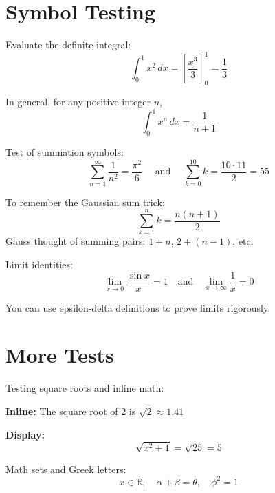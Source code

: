 \documentclass[11pt]{article}
\begin{document}
\section*{Symbol Testing}

\begin{examplebox}
Evaluate the definite integral:
\[
\int_0^1 x^2 \, dx = \left[ \frac{x^3}{3} \right]_0^1 = \frac{1}{3}
\]
\end{examplebox}

\begin{keynotebox}
In general, for any positive integer \( n \),
\[
\int_0^1 x^n \, dx = \frac{1}{n+1}
\]
\end{keynotebox}


\begin{examplebox}
Test of summation symbols:
\[
\sum_{n=1}^{\infty} \frac{1}{n^2} = \frac{\pi^2}{6}
\quad \text{ and } \quad
\sum_{k=0}^{10} k = \frac{10 \cdot 11}{2} = 55
\]
\end{examplebox}

\begin{funbox}
To remember the Gaussian sum trick:
\[
\sum_{k=1}^{n} k = \frac{n(n+1)}{2}
\]
Gauss thought of summing pairs: \(1 + n\), \(2 + (n-1)\), etc.
\end{funbox}

\begin{examplebox}
Limit identities:
\[
\lim_{x \to 0} \frac{\sin x}{x} = 1 \quad \text{and} \quad \lim_{x \to \infty} \frac{1}{x} = 0
\]
\end{examplebox}

\begin{keynotebox}
You can use epsilon-delta definitions to prove limits rigorously.
\end{keynotebox}

\newpage

\section*{More Tests}

\begin{examplebox}
Testing square roots and inline math:

\textbf{Inline:} The square root of 2 is \( \sqrt{2} \approx 1.41 \)

\textbf{Display:}
\[
\sqrt{x^2 + 1} = \sqrt{25} = 5
\]
\end{examplebox}

\begin{examplebox}
Math sets and Greek letters:
\[
x \in \mathbb{R}, \quad \alpha + \beta = \theta, \quad \phi^2 = 1
\]
\end{examplebox}
\end{document}
